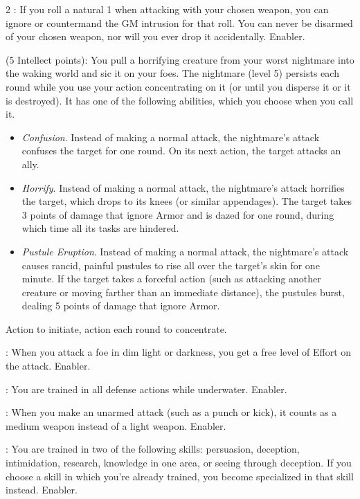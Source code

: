 \begin{multicols}{2}
: If you roll a natural 1 when attacking with your chosen weapon, you can ignore or countermand the GM intrusion for that roll. You can never be disarmed of your chosen weapon, nor will you ever drop it accidentally. Enabler. 
 
 (5 Intellect points): You pull a horrifying creature from your worst nightmare into the waking world and sic it on your foes. The nightmare (level 5) persists each round while you use your action concentrating on it (or until you disperse it or it is destroyed). It has one of the following abilities, which you choose when you call it. 
\begin{itemize} 
\item \textit{Confusion}. Instead of making a normal attack, the nightmare’s attack confuses the target for one round. On its next action, the target attacks an ally. 
\item \textit{Horrify}. Instead of making a normal attack, the nightmare’s attack horrifies the target, which drops to its knees (or similar appendages). The target takes 3 points of damage that ignore Armor and is dazed for one round, during which time all its tasks are hindered. 
\item \textit{Pustule Eruption}. Instead of making a normal attack, the nightmare’s attack causes rancid, painful pustules to rise all over the target’s skin for one minute. If the target takes a forceful action (such as attacking another creature or moving farther than an immediate distance), the pustules burst, dealing 5 points of damage that ignore Armor. 
\end{itemize}
Action to initiate, action each round to concentrate.
 
: When you attack a foe in dim light or darkness, you get a free level of Effort on the attack. Enabler. 
 
: You are trained in all defense actions while underwater. Enabler. 
 
: When you make an unarmed attack (such as a punch or kick), it counts as a medium weapon instead of a light weapon. Enabler. 
 
: You are trained in two of the following skills: persuasion, deception, intimidation, research, knowledge in one area, or seeing through deception. If you choose a skill in which you’re already trained, you become specialized in that skill instead. Enabler. 
 

\end{multicols}

